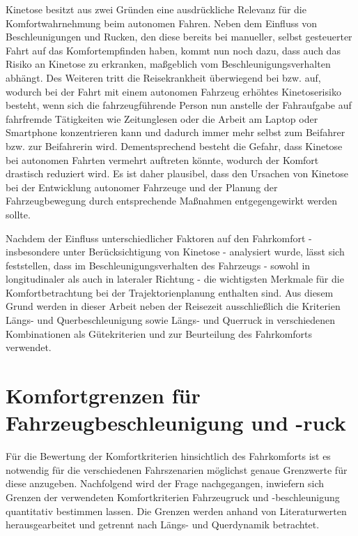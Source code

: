 Kinetose besitzt aus zwei Gründen eine ausdrückliche Relevanz für die Komfortwahrnehmung beim autonomen Fahren. Neben dem Einfluss von Beschleunigungen und Rucken, den diese bereits bei manueller, selbst gesteuerter Fahrt auf das Komfortempfinden haben, kommt nun noch dazu, dass auch das Risiko an Kinetose zu erkranken, maßgeblich vom Beschleunigungsverhalten abhängt. Des Weiteren tritt die Reisekrankheit überwiegend bei  bzw.  auf, wodurch bei der Fahrt mit einem autonomen Fahrzeug erhöhtes Kinetoserisiko besteht, wenn sich die fahrzeugführende Person nun anstelle der Fahraufgabe auf fahrfremde Tätigkeiten wie Zeitunglesen oder die Arbeit am Laptop oder Smartphone konzentrieren kann und dadurch immer mehr selbst zum Beifahrer bzw. zur Beifahrerin wird. Dementsprechend besteht die Gefahr, dass Kinetose bei autonomen Fahrten vermehrt auftreten könnte, wodurch der Komfort drastisch reduziert wird. Es ist daher plausibel, dass den Ursachen von Kinetose bei der Entwicklung autonomer Fahrzeuge und der Planung der Fahrzeugbewegung durch entsprechende Maßnahmen entgegengewirkt werden sollte. 

Nachdem der Einfluss unterschiedlicher Faktoren auf den Fahrkomfort - insbesondere unter Berücksichtigung von Kinetose - analysiert wurde, lässt sich feststellen, dass im Beschleunigungsverhalten des Fahrzeugs - sowohl in longitudinaler als auch in lateraler Richtung - die wichtigsten Merkmale für die Komfortbetrachtung bei der Trajektorienplanung enthalten sind. Aus diesem Grund werden in dieser Arbeit neben der Reisezeit ausschließlich die Kriterien Längs- und Querbeschleunigung sowie Längs- und Querruck in verschiedenen Kombinationen als Gütekriterien und zur Beurteilung des Fahrkomforts verwendet. 

\section{Komfortgrenzen für Fahrzeugbeschleunigung und -ruck} \label{sec:komfortgrenzen}
Für die Bewertung der Komfortkriterien hinsichtlich des Fahrkomforts ist es notwendig für die verschiedenen Fahrszenarien möglichst genaue Grenzwerte für diese anzugeben. Nachfolgend wird der Frage nachgegangen, inwiefern sich Grenzen der verwendeten Komfortkriterien Fahrzeugruck und -beschleunigung quantitativ bestimmen lassen. Die Grenzen werden anhand von Literaturwerten herausgearbeitet und getrennt nach Längs- und Querdynamik betrachtet.


